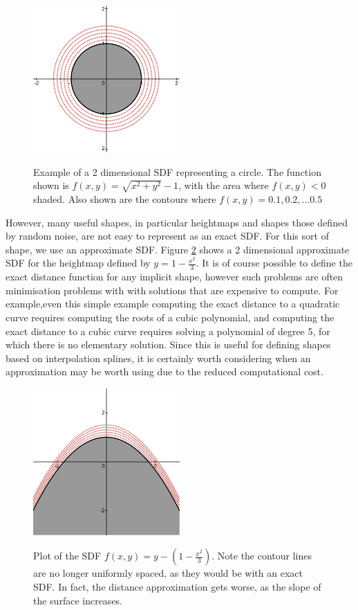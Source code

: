 \documentclass{article}
\begin{document}
\begin{figure}
\caption{Example of a 2 dimensional SDF representing a circle. The function shown is $f\left(x,y\right) = \sqrt{x^2+y^2}-1$, with the area where $f\left(x,y\right) < 0 $ shaded. Also shown are the contours where $f\left(x,y\right) = 0.1,0.2,...0.5$}
\includegraphics[width=0.5\textwidth]{Circle_SDF}
\label{fig:Circle_SDF}
\end{figure}

However, many useful shapes, in particular heightmaps and shapes those defined by random noise, are not easy to represent as an exact SDF. For this sort of shape, we use an approximate SDF. Figure \ref{fig:Hill_SDF} shows a 2 dimensional approximate SDF for the heightmap defined by $y=1-\frac{x^2}{3}$. It is of course possible to define the exact distance function for any implicit shape, however such problems are often minimisation problems with with solutions that are expensive to compute. For example,even this simple example computing the exact distance to a quadratic curve requires computing the roots of a cubic polynomial, and computing the exact distance to a cubic curve requires solving a polynomial of degree 5, for which there is no elementary solution. Since this is useful for defining shapes based on interpolation splines, it is certainly worth considering when an approximation may be worth using due to the reduced computational cost.

\begin{figure}
\caption{Plot of the SDF $f\left(x,y\right) = y - \left(1 - \frac{x^2}{3}\right)$. Note the contour lines are no longer uniformly spaced, as they would be with an exact SDF. In fact, the distance approximation gets worse, as the slope of the surface increases.}
\includegraphics[width=0.5\textwidth]{Hill_SDF}
\label{fig:Hill_SDF}
\end{figure}
\end{document}
